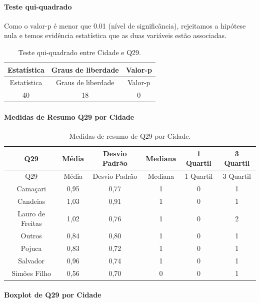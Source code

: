 \documentclass[]{article}
\let\oldparagraph\paragraph
\renewcommand{\paragraph}[1]{\oldparagraph{#1}\mbox{}}
\begin{document}
\hypertarget{teste-qui-quadrado-77}{%
\paragraph{Teste qui-quadrado}\label{teste-qui-quadrado-77}}

Como o valor-p é menor que 0.01 (nível de significância), rejeitamos a hipótese nula e temos evidência estatística que as duas variáveis estão associadas.

\begin{longtable}[]{@{}ccc@{}}
\caption{\label{tab:unnamed-chunk-900}Teste qui-quadrado entre Cidade e Q29.}\tabularnewline
\toprule
Estatística & Graus de liberdade & Valor-p\tabularnewline
\midrule
\endfirsthead
\toprule
Estatística & Graus de liberdade & Valor-p\tabularnewline
\midrule
\endhead
40 & 18 & 0\tabularnewline
\bottomrule
\end{longtable}

\cleardoublepage

\hypertarget{medidas-de-resumo-q29-por-cidade}{%
\paragraph{Medidas de Resumo Q29 por Cidade}\label{medidas-de-resumo-q29-por-cidade}}

\begin{longtable}[]{@{}cccccc@{}}
\caption{\label{tab:unnamed-chunk-901}Medidas de resumo de Q29 por Cidade.}\tabularnewline
\toprule
Q29 & Média & Desvio Padrão & Mediana & 1 Quartil & 3 Quartil\tabularnewline
\midrule
\endfirsthead
\toprule
Q29 & Média & Desvio Padrão & Mediana & 1 Quartil & 3 Quartil\tabularnewline
\midrule
\endhead
Camaçari & 0,95 & 0,77 & 1 & 0 & 1\tabularnewline
Candeias & 1,03 & 0,91 & 1 & 0 & 1\tabularnewline
Lauro de Freitas & 1,02 & 0,76 & 1 & 0 & 2\tabularnewline
Outros & 0,84 & 0,80 & 1 & 0 & 1\tabularnewline
Pojuca & 0,83 & 0,72 & 1 & 0 & 1\tabularnewline
Salvador & 0,96 & 0,74 & 1 & 0 & 1\tabularnewline
Simões Filho & 0,56 & 0,70 & 0 & 0 & 1\tabularnewline
\bottomrule
\end{longtable}

\hypertarget{boxplot-de-q29-por-cidade}{%
\paragraph{Boxplot de Q29 por Cidade}\label{boxplot-de-q29-por-cidade}}
\end{document}
